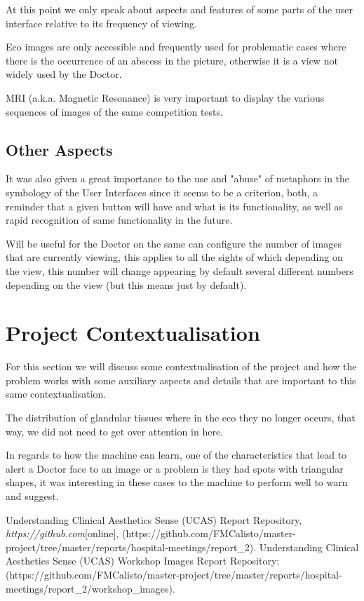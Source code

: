 At this point we only speak about aspects and features of some parts of the user interface relative to its frequency of viewing.

Eco images are only accessible and frequently used for problematic cases where there is the occurrence of an abscess in the picture, otherwise it is a view not widely used by the Doctor.

MRI (a.k.a. Magnetic Resonance) is very important to display the various sequences of images of the same competition tests.

\subsection{Other Aspects}

It was also given a great importance to the use and "abuse" of metaphors in the symbology of the User Interfaces since it seems to be a criterion, both, a reminder that a given button will have and what is its functionality, as well as rapid recognition of same functionality in the future.

Will be useful for the Doctor on the same can configure the number of images that are currently viewing, this applies to all the sights of which depending on the view, this number will change appearing by default several different numbers depending on the view (but this means just by default).


\section{Project Contextualisation}

For this section we will discuss some contextualisation of the project and how the problem works with some auxiliary aspects and details that are important to this same contextualisation.

The distribution of glandular tissues where in the eco they no longer occurs, that way, we did not need to get over attention in here.

In regards to how the machine can learn, one of the characteristics that lead to alert a Doctor face to an image or a problem is they had spots with triangular shapes, it was interesting in these cases to the machine to perform well to warn and suggest.


\begin{thebibliography}{}
 Understanding Clinical Aesthetics Sense (UCAS) Report Repository, \emph{https://github.com}[online], (https://github.com/FMCalisto/master-project/tree/master/reports/hospital-meetings/report\_2).
 Understanding Clinical Aesthetics Sense (UCAS) Workshop Images Report Repository: (https://github.com/FMCalisto/master-project/tree/master/reports/hospital-meetings/report\_2/workshop\_images).
\end{thebibliography}



